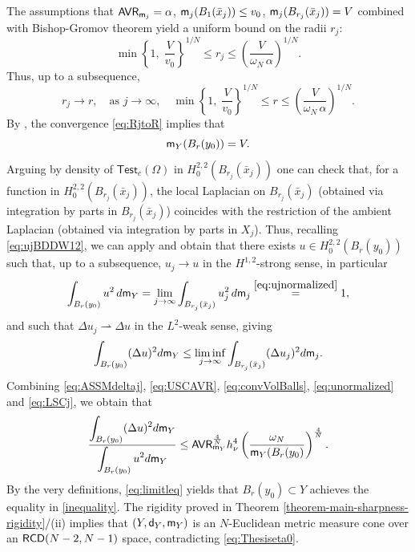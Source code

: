 \documentclass[11pt, reqno]{amsart}
\numberwithin{equation}{section}
\begin{document}
		The assumptions that ${\sf AVR}_{{\sf m}_j}=\alpha$,  ${\sf m}_j(B_1(\bar x_j))\leq v_0$,  ${\sf m}_j(B_{r_j}(\bar x_j))=V$ combined with Bishop-Gromov theorem yield a uniform bound on the radii $r_j$:
		\begin{equation*}
		\min\left\{1,\; \frac{V}{v_0} \right\} ^{1/N} \leq r_j \leq  \left( \frac{V}{\omega_N \, \alpha} \right)^{1/N}.
		\end{equation*}
		Thus, up to a subsequence,
		\begin{equation}\label{eq:RjtoR}
		r_j \to r, \quad \text{as } j\to \infty, \quad \min\left\{1,\; \frac{V}{v_0} \right\} ^{1/N} \leq r \leq  \left( \frac{V}{\omega_N \, \alpha} \right)^{1/N}.
		\end{equation}
		By \cite[Lemma 4.13]{MV-CVPDE}, the convergence \eqref{eq:RjtoR} implies that 
		\begin{equation}\label{eq:convVolBalls}
		{\sf m}_{Y}(B_{r}(y_{0}))=V.
		\end{equation}
		Arguing by density of $\mathsf{Test}_c(\Omega)$ in $H^{2,2}_0(B_{r_j}(\bar x_j))$  one can check that, for a function in  $H^{2,2}_0(B_{r_j}(\bar x_j))$, the local Laplacian on $B_{r_j}(\bar x_j)$ (obtained via integration by parts in $B_{r_j}(\bar x_j)$) coincides with the restriction of the ambient Laplacian  (obtained via integration by parts in $X_j$). Thus, recalling \eqref{eq:ujBDDW12},    we can apply   \cite[Theorem 4.4] {Ambrosio-Honda}  and obtain that there exists $u\in H^{2,2}_{0}(B_{r}(y_{0}))$ such that, up to a subsequence, $u_j\to u$ in the  $H^{1,2}$-strong sense, in particular
		\begin{equation}\label{eq:unormalized}
		\int_{B_{r}(y_0)} u^2 \, {\rm d}{\sf m}_{Y}= \lim_{j\to \infty} \int_{B_{r_{j}}(\bar x_{j})} u_{j}^2 \, {\rm d}{\sf m}_{j} \overset{\eqref{eq:ujnormalized}} {=}1,
		\end{equation}
		 and such that $\Delta u_{j}\rightharpoonup \Delta u$ in the  $L^2$-weak sense, giving
		 \begin{equation}\label{eq:LSCj}
			\int_{B_{r}(y_{0})} (\Delta u)^2 {\rm d}{\sf m}_{Y}  \leq \liminf_{j\to \infty}  \int_{B_{r_{j}}(\bar x_{j})} (\Delta u_{j})^2 {\rm d}{\sf m}_{j}.
				\end{equation}
				Combining  \eqref{eq:ASSMdeltaj},  \eqref{eq:USCAVR}, \eqref{eq:convVolBalls}, \eqref{eq:unormalized} and  \eqref{eq:LSCj}, we obtain that
				\begin{equation}\label{eq:limitleq}
			\frac{\displaystyle\int_{B_{r}(y_{0})} (\Delta u)^2 {\rm d}{\sf m}_{Y}}{\displaystyle\int_{B_{r}(y_{0})} u^2 {\rm d}{\sf m}_{Y} } \leq {\sf AVR}_{{\sf m}_{Y}}^\frac{4}{N} h_\nu^4 \left(\frac{\omega_N}{{\sf m}_{Y}(B_{r}(y_{0})} \right)^\frac{4}{N}.
							\end{equation}
		By the very definitions, \eqref{eq:limitleq} yields that $B_{r}(y_{0})\subset Y$ achieves the equality in  \eqref{inequality}. The rigidity proved in Theorem \ref{theorem-main-sharpness-rigidity}/(ii)  implies that $(Y, {\sf d}_{Y}, {\sf m}_{Y})$ is an $N$-Euclidean metric measure cone over an ${\sf RCD}(N-2,N-1)$ space, contradicting  \eqref{eq:Thesiseta0}. 
  
\end{document}
